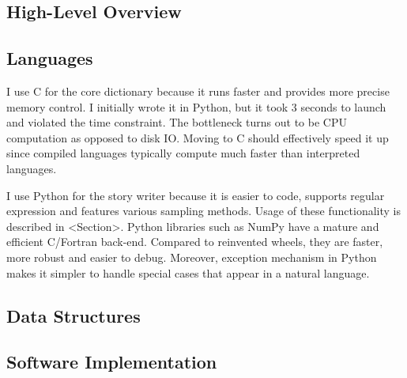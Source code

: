 \documentclass[../main.tex]{subfiles}
\begin{document}
\subsection{High-Level Overview}

\subsection{Languages}

I use C for the core dictionary because it runs faster and provides more precise memory control. I initially wrote it in Python, but it took 3 seconds to launch and violated the time constraint. The bottleneck turns out to be CPU computation as opposed to disk IO. Moving to C should effectively speed it up since compiled languages typically compute much faster than interpreted languages.

I use Python for the story writer because it is easier to code, supports regular expression and features various sampling methods. Usage of these functionality is described in <Section>. Python libraries such as NumPy have a mature and efficient C/Fortran back-end. Compared to reinvented wheels, they are faster, more robust and easier to debug. Moreover, exception mechanism in Python makes it simpler to handle special cases that appear in a natural language.

\subsection{Data Structures}

\subsection{Software Implementation}
\end{document}
